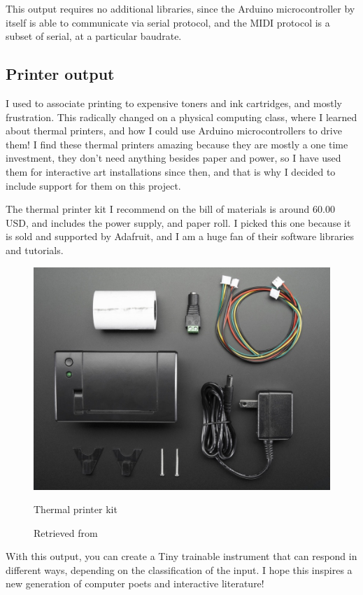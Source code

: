 This output requires no additional libraries, since the Arduino microcontroller by itself is able to communicate via serial protocol, and the MIDI protocol is a subset of serial, at a particular baudrate.

\subsection{Printer output}

I used to associate printing to expensive toners and ink cartridges, and mostly frustration. This radically changed on a physical computing class, where I learned about thermal printers, and how I could use Arduino microcontrollers to drive them! I find these thermal printers amazing because they are mostly a one time investment, they don't need anything besides paper and power, so I have used them for interactive art installations since then, and that is why I decided to include support for them on this project.

The thermal printer kit I recommend on the bill of materials is around 60.00 USD, and includes the power supply, and paper roll. I picked this one because it is sold and supported by Adafruit, and I am a huge fan of their software libraries and tutorials. 

\begin{figure}[ht]
  \centering
  \includegraphics[width=0.75\linewidth,height=0.25\textheight,keepaspectratio]{images/materials-adafruit-thermal-printer.jpg}
  \caption{Thermal printer kit}
  \caption*{Retrieved from \cite{website-materials-adafruit-thermal-printer}}
  \label{fig:materials-adafruit-thermal-printer}
\end{figure}

With this output, you can create a Tiny trainable instrument that can respond in different ways, depending on the classification of the input. I hope this inspires a new generation of computer poets and interactive literature!

